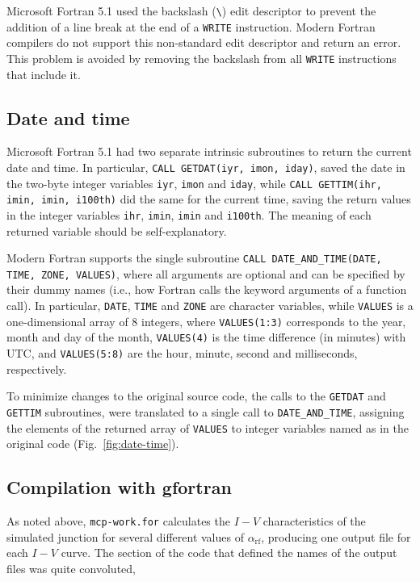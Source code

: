 Microsoft Fortran 5.1 used the backslash (\texttt{\textbackslash{}}) edit descriptor to prevent the addition of a line break at the end of a \texttt{WRITE} instruction.
Modern Fortran compilers do not support this  non-standard edit descriptor and return an error. This problem is avoided by removing the backslash from all \texttt{WRITE} instructions that include it.



\subsection{Date and time}

Microsoft Fortran 5.1 had two separate intrinsic subroutines to return the current date and time.
In particular, \texttt{CALL GETDAT(iyr, imon, iday)}, saved the date in the two-byte integer variables \texttt{iyr}, \texttt{imon} and \texttt{iday}, while \texttt{CALL GETTIM(ihr, imin, imin, i100th)} did the same for the current time, saving the return values in the integer variables \texttt{ihr}, \texttt{imin}, \texttt{imin} and \texttt{i100th}. The meaning of each returned variable should be self-explanatory.

Modern Fortran supports the single subroutine \texttt{CALL DATE\_AND\_TIME(DATE, TIME, ZONE, VALUES)}, where all arguments are optional and can be specified by their dummy names (i.e., how Fortran calls the keyword arguments of a function call). 
In particular, \texttt{DATE}, \texttt{TIME} and \texttt{ZONE} are character variables, while \texttt{VALUES} is a one-dimensional array of 8 integers, where \texttt{VALUES(1:3)} corresponds to the year, month and day of the month, \texttt{VALUES(4)} is the time difference (in minutes) with UTC, and \texttt{VALUES(5:8)} are the hour, minute, second and milliseconds, respectively.

To minimize changes to the original source code, the calls to the \texttt{GETDAT} and \texttt{GETTIM} subroutines, were translated to a single call to \texttt{DATE\_AND\_TIME}, assigning the elements of the returned array of \texttt{VALUES} to integer variables named as in the original code (Fig.~\ref{fig:date-time}).



\subsection{Compilation with gfortran}
\label{compilation-with-gfortran}

As noted above, \texttt{mcp-work.for} calculates the $I - V$ characteristics of the simulated junction for several different values of $\alpha_\mathrm{rf}$, producing one output file for each $I - V$ curve. The section of the code that defined the names of the output files was quite convoluted,

